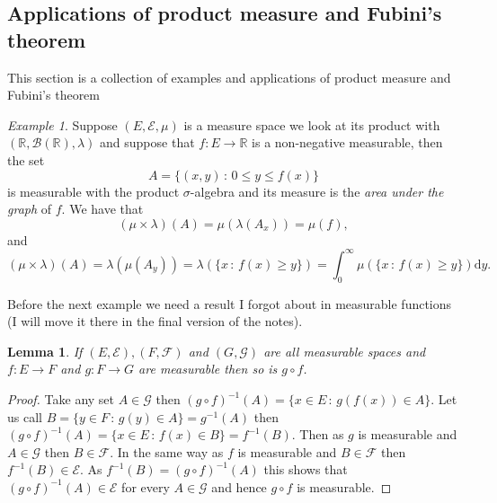 \documentclass[11pt]{article}
\newtheorem{lem}[thm]{Lemma}
\theoremstyle{definition}
\theoremstyle{remark}
\newtheorem{ex}[thm]{Example}
\begin{document}
\subsection{Applications of product measure and Fubini's theorem}
This section is a collection of examples and applications of product measure and Fubini's theorem

\begin{ex}
Suppose $(E, \mathcal{E}, \mu)$ is a measure space we look at its product with $(\mathbb{R}, \mathcal{B}(\mathbb{R}), \lambda)$ and suppose that $f:E \rightarrow \mathbb{R}$ is a non-negative measurable, then the set
\[ A = \{(x,y) \,:\, 0 \leq y \leq f(x) \} \] is measurable with the product $\sigma$-algebra and its measure is the \emph{area under the graph} of $f$. We have that 
\[ (\mu \times \lambda)(A) = \mu( \lambda(A_x)) = \mu(f),  \] and
\[ (\mu \times \lambda)(A) = \lambda( \mu(A_y)) = \lambda (\{ x \,:\, f(x) \geq y \}) = \int_0^ \infty \mu(\{x \,:\, f(x) \geq y\}) \mathrm{d}y. \]
\end{ex}

Before the next example we need a result I forgot about in measurable functions (I will move it there in the final version of the notes). 
\begin{lem}
If $(E, \mathcal{E}), (F, \mathcal{F})$ and $(G, \mathcal{G})$ are all measurable spaces and $f : E \rightarrow F$ and $g: F \rightarrow G$ are measurable then so is $g \circ f$.
\end{lem}
\begin{proof}
Take any set $A \in \mathcal{G}$ then $(g\circ f)^{-1}(A) = \{ x \in E \,:\, g(f(x))  \in A\}$. Let us call $B = \{y \in F \,:\, g(y) \in A\} = g^{-1}(A)$ then $(g \circ f)^{-1}(A) = \{ x \in E \,:\, f(x) \in B\} = f^{-1}(B)$. Then as $g$ is measurable and $A \in \mathcal{G}$ then $B \in \mathcal{F}$. In the same way as $f$ is measurable and $B \in \mathcal{F}$ then $f^{-1}(B) \in \mathcal{E}$. As $f^{-1}(B) = (g \circ f)^{-1}(A)$ this shows that $(g \circ f)^{-1}(A) \in \mathcal{E}$ for every $A \in \mathcal{G}$ and hence $g \circ f$ is measurable.
\end{proof}
\end{document}
